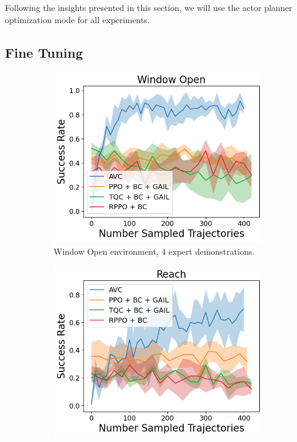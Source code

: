Following the insights presented in this section, we will use the actor planner optimization mode for all experiments.



\subsection{Fine Tuning}
\label{sec:fine_tuning}

\begin{figure}[htbp]
  \centering
  \begin{subfigure}[t]{0.45\textwidth}
    \includegraphics[width=\textwidth]{images/4_400/Window Open.png}
    \caption{Window Open environment, 4 expert demonstrations.}
  \end{subfigure}
  \begin{subfigure}[t]{0.45\textwidth}
    \includegraphics[width=\textwidth]{images/4_400/Reach.png}

\end{subfigure}
\end{figure}
